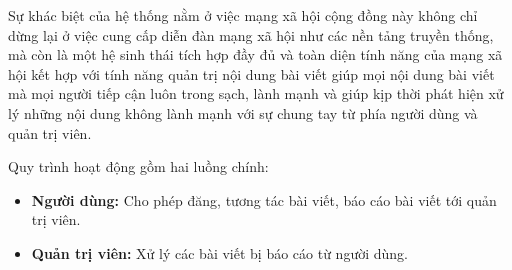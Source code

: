 Sự khác biệt của hệ thống nằm ở việc mạng xã hội cộng đồng này không chỉ dừng lại ở việc cung cấp diễn đàn mạng xã hội như các nền tảng truyền thống, mà còn là một hệ sinh thái tích hợp đầy đủ và toàn diện tính năng của mạng xã hội kết hợp với tính năng quản trị nội dung bài viết giúp mọi nội dung bài viết mà mọi người tiếp cận luôn trong sạch, lành mạnh và giúp kịp thời phát hiện xử lý những nội dung không lành mạnh với sự chung tay từ phía người dùng và quản trị viên.

Quy trình hoạt động gồm hai luồng chính:
\begin{itemize}
    \item \textbf{Người dùng:} Cho phép đăng, tương tác bài viết, báo cáo bài viết tới quản trị viên.
    \item \textbf{Quản trị viên:} Xử lý các bài viết bị báo cáo từ người dùng.
\end{itemize}

